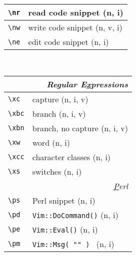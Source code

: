\documentclass[oneside,10pt,landscape,DIV17]{scrartcl}
\begin{document}
\begin{multicols}{3}
\begin{center}
\begin{tabular}[]{|p{11mm}|p{56mm}|}
\hline \verb'\nr'  & read code snippet         \hfill (n, i)   \\
\hline \verb'\nw'  & write code snippet        \hfill (n, v, i)\\
\hline \verb'\ne'  & edit code snippet         \hfill (n, i)   \\
%
\hline
\end{tabular}\\
%
%
\begin{tabular}[]{|p{11mm}|p{60mm}|}
\hline
\multicolumn{2}{|r|}{\textsl{Regular E\underline{x}pressions}}     \\[1.0ex]
\hline \verb'\xc'  & capture                 \hfill (n, i, v)\\
\hline \verb'\xbc' & branch                  \hfill (n, i, v)\\
\hline \verb'\xbn' & branch, no capture      \hfill (n, i, v)\\
\hline \verb'\xw'  & word                    \hfill (n, i)\\
\hline \verb'\xcc' & character classes       \hfill (n, i)\\
\hline \verb'\xs'  & switches                \hfill (n, i)\\
\hline
\hline
\multicolumn{2}{|r|}{\textsl{\underline{P}erl}}                       \\[1.0ex]
\hline \verb'\ps'   & Perl snippet \hfill (n, i)\\
\hline \verb'\pd'   & \texttt{Vim::DoCommand()} \hfill (n, i)\\
\hline \verb'\pe'   & \texttt{Vim::Eval()} \hfill (n, i)\\
\hline \verb'\pm'   & \texttt{Vim::Msg( "" )           } \hfill (n, i)\\

\end{tabular}
\end{center}
\end{multicols}
\end{document}
